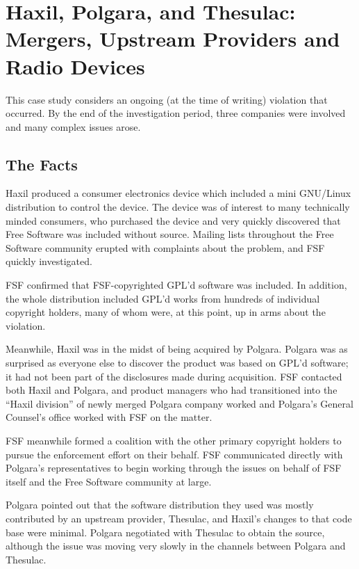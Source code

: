 \documentclass[12pt]{report}
\begin{document}
\chapter{Haxil, Polgara, and Thesulac: Mergers, Upstream Providers and Radio Devices}

This case study considers an ongoing (at the time of writing) violation
that occurred.  By the end of the investigation period, three companies
were involved and many complex issues arose.

\section{The Facts}

Haxil produced a consumer electronics device which included a mini
GNU/Linux distribution to control the device.  The device was of interest
to many technically minded consumers, who purchased the device and very
quickly discovered that Free Software was included without source.
Mailing lists throughout the Free Software community erupted with
complaints about the problem, and FSF quickly investigated.

FSF confirmed that FSF-copyrighted GPL'd software was included.  In
addition, the whole distribution included GPL'd works from hundreds of
individual copyright holders, many of whom were, at this point, up in
arms about the violation.

Meanwhile, Haxil was in the midst of being acquired by Polgara.  Polgara
was as surprised as everyone else to discover the product was based on
GPL'd software; it had not been part of the disclosures made during
acquisition.  FSF contacted both Haxil and Polgara, and product managers
who had transitioned into the ``Haxil division'' of newly merged Polgara
company worked and Polgara's General Counsel's office worked with FSF on
the matter.

FSF meanwhile formed a coalition with the other primary copyright holders
to pursue the enforcement effort on their behalf.  FSF communicated
directly with Polgara's representatives to begin working through the
issues on behalf of FSF itself and the Free Software community at large.

Polgara pointed out that the software distribution they used was mostly
contributed by an upstream provider, Thesulac, and Haxil's changes to that
code base were minimal.  Polgara negotiated with Thesulac to obtain the
source, although the issue was moving very slowly in the channels between
Polgara and Thesulac.
\end{document}
